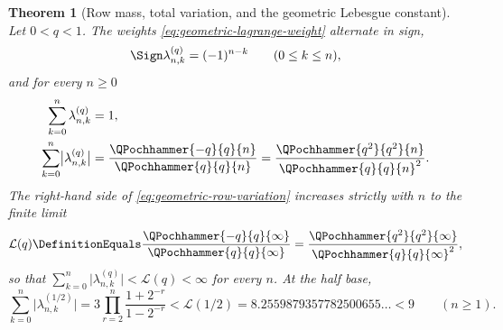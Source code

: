 \documentclass[11pt,a4paper,oneside,openany]{book}
\newtheorem{theorem}{Theorem}[chapter]
\theoremstyle{definition}
\theoremstyle{remark}
\begin{document}

\begin{theorem}[Row mass, total variation, and the geometric Lebesgue constant]\label{thm:geometric-row-variation}
Let $0<q<1$.  The weights \eqref{eq:geometric-lagrange-weight} alternate in sign,
\begin{equation}\label{eq:geometric-lagrange-signs}
 \Sign\lambda_{n,k}^{(q)}=(-1)^{n-k}
 \qquad(0\le k\le n),
\end{equation}
and for every $n\ge0$
\begin{align}
 \sum_{k=0}^{n}\lambda_{n,k}^{(q)}&=1,
 \label{eq:geometric-row-mass}\\
 \sum_{k=0}^{n}\bigl|\lambda_{n,k}^{(q)}\bigr|
 &=\frac{\QPochhammer{-q}{q}{n}}{\QPochhammer{q}{q}{n}}
  =\frac{\QPochhammer{q^2}{q^2}{n}}{\QPochhammer{q}{q}{n}^{2}} .
 \label{eq:geometric-row-variation}
\end{align}
The right-hand side of \eqref{eq:geometric-row-variation} increases strictly with $n$ to
the finite limit
\begin{equation}\label{eq:geometric-lebesgue-constant}
 \mathcal L(q)\DefinitionEquals\frac{\QPochhammer{-q}{q}{\infty}}{\QPochhammer{q}{q}{\infty}}
              =\frac{\QPochhammer{q^2}{q^2}{\infty}}{\QPochhammer{q}{q}{\infty}^{2}},
\end{equation}
so that $\sum_{k=0}^{n}\bigl|\lambda_{n,k}^{(q)}\bigr|<\mathcal L(q)<\infty$ for every
$n$.  At the half base,
\begin{equation}\label{eq:halfbase-row-variation-bound}
 \sum_{k=0}^{n}\bigl|\lambda_{n,k}^{(1/2)}\bigr|
 =3\prod_{r=2}^{n}\frac{1+2^{-r}}{1-2^{-r}}
 <\mathcal L(1/2)=8.2559879357782500655\ldots<9
 \qquad(n\ge1).
\end{equation}
\end{theorem}
\end{document}
